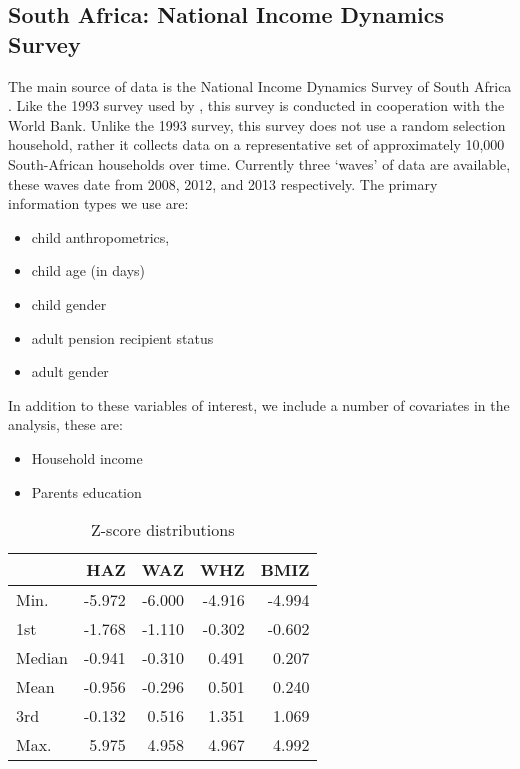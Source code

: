 \begin{refsection}
\subsection{South Africa: National Income Dynamics Survey}
The main source of data is the National Income Dynamics Survey of South Africa \parencite{saldru2008nids, saldru2012nids, saldru2013nids}.
Like the 1993 survey used by \textcite{duflo2000child, duflo2003grandmothers}, this survey is conducted in cooperation with the World Bank.
Unlike the 1993 survey, this survey does not use a random selection household,
rather it collects data on a representative set of approximately 10,000 South-African households over time.
Currently three `waves' of data are available, these waves date from 2008, 2012, and 2013 respectively.
The primary information types we use are:
\begin{itemize}
  \item child anthropometrics,
  \item child age (in days)
  \item child gender
  \item adult pension recipient status
  \item adult gender
\end{itemize}
In addition to these variables of interest, we include a number of covariates in the analysis, these are:
\begin{itemize}
  \item Household income
  \item Parents education
\end{itemize}

\begin{table}[hb!]
\centering
\caption{Z-score distributions}
\label{sa:ta:zscore}
    \begin{tabular}{l|rrrr}
    \hline
    & HAZ & WAZ & WHZ & BMIZ\\
    \hline
    Min.   & -5.972 & -6.000  & -4.916 & -4.994 \\
    1st    & -1.768 & -1.110  & -0.302 & -0.602 \\
    Median & -0.941 & -0.310  &  0.491  & 0.207  \\
    Mean   & -0.956 & -0.296  &  0.501  & 0.240   \\
    3rd    & -0.132 &  0.516  &  1.351  & 1.069  \\
    Max.   &  5.975 &  4.958  &  4.967  & 4.992  \\
    \end{tabular}
\end{table}


\end{refsection}
